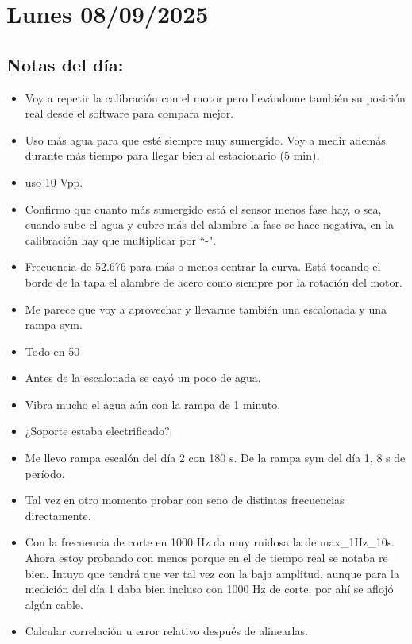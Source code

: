 
\section{Lunes 08/09/2025} 
\subsection*{Notas del día:} 
\begin{itemize}
	\item Voy a repetir la calibración con el motor pero llevándome también su posición real desde el software para compara mejor. 
	\item Uso más agua para que esté siempre muy sumergido. Voy a medir además durante más tiempo para llegar bien al estacionario (5 min).  
	
	\item uso 10 Vpp. 
	
	\item Confirmo que cuanto más sumergido está el sensor menos fase hay, o sea, cuando sube el agua y cubre más del alambre la fase se hace negativa, en la calibración hay que multiplicar por ``-". 
	
	\item Frecuencia de 52.676 para más o menos centrar la curva. Está tocando el borde de la tapa el alambre de acero como siempre por la rotación del motor. 
	\item Me parece que voy a aprovechar y llevarme también una escalonada y una rampa sym. 
	\item Todo en 50%
	\item Antes de la escalonada se cayó un poco de agua. 
	\item Vibra mucho el agua aún con la rampa de 1 minuto. 
	
	\item ¿Soporte estaba electrificado?. 
	
	\item Me llevo rampa escalón del día 2 con 180 s. De la rampa sym del día 1, 8 s de período. 
	\item Tal vez en otro momento probar con seno de distintas frecuencias directamente. 
	
	\item Con la frecuencia de corte en 1000 Hz da muy ruidosa la de max\_1Hz\_10s. Ahora estoy probando con menos porque en el de tiempo real se notaba re bien. Intuyo que tendrá que ver tal vez con la baja amplitud, aunque para la medición del día 1 daba bien incluso con 1000 Hz de corte. por ahí se aflojó algún cable. 
	
	\item Calcular correlación u error relativo después de alinearlas. 
\end{itemize}

